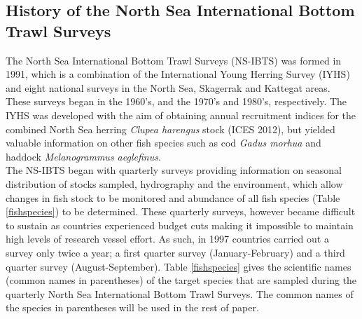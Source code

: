 \documentclass[a4paper 12pt]{article}
\numberwithin{equation}{section}
\begin{document}
\subsection{History of the North Sea International Bottom Trawl Surveys}
\indent The North Sea International Bottom Trawl Surveys (NS-IBTS) was formed in 1991, which is a combination of the International Young Herring Survey (IYHS) and eight national surveys in the North Sea, Skagerrak and Kattegat areas. These surveys began in the 1960's, and the 1970's and 1980's, respectively. The IYHS was developed with the aim of obtaining annual recruitment indices for the combined North Sea herring \emph{Clupea harengus} stock (ICES 2012), but yielded valuable information on other fish species such as cod \emph{Gadus morhua} and haddock \emph{Melanogrammus aeglefinus}.\\
\indent The NS-IBTS began with quarterly surveys providing information on seasonal distribution of stocks sampled, hydrography and the environment, which allow changes in fish stock to be monitored and abundance of all fish species  (Table \ref{fishspecies}) to be determined. These quarterly surveys, however became difficult to sustain as countries experienced budget cuts making it impossible to maintain high levels of research vessel effort. As such, in 1997 countries carried out a survey only twice a year; a first quarter survey (January-February) and a third quarter survey (August-September). Table \ref{fishspecies} gives the scientific names (common names in parentheses) of the target species that are sampled during the quarterly North Sea International Bottom Trawl Surveys. The common names of the species in parentheses will be used in the rest of paper.\\

\end{document}
